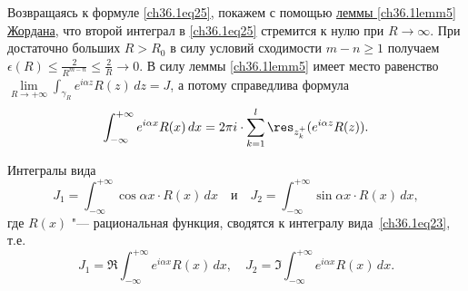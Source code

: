 Возвращаясь к формуле \eqref{ch36.1eq25}, покажем с помощью \hyperref[ch36.1lemm5]{леммы \ref{ch36.1lemm5} Жордана}, что второй интеграл в \eqref{ch36.1eq25} стремится к нулю при $R \to \infty$. При достаточно больших $R > R_0$ в силу условий сходимости $m - n \ge 1$ получаем $\epsilon(R) \le \frac{2}{R^{m - n}} \le \frac{2}{R} \to 0$. В силу леммы  \ref{ch36.1lemm5} имеет место равенство $\lim\limits_{R \to +\infty} \int_{\gamma_R} e^{i \alpha z}R(z) \,dz = J$, а потому справедлива формула
\begin{equation} \label{ch36.1eq27}
\int_{-\infty}^{+\infty} e^{i \alpha x}R(x) \,dx = 2\pi i \cdot \sum_{k = 1}^l \res_{z_k^+} (e^{i \alpha z}R(z)).
\end{equation}

\begin{cons} \label{ch36.1cons2}
Интегралы вида
\begin{equation} \label{ch36.1eq28}
J_1 = \int_{-\infty}^{+\infty} \cos\alpha x \cdot R(x) \,dx \quad \text{и} \quad J_2 = \int_{-\infty}^{+\infty} \sin \alpha x \cdot R(x) \,dx,
\end{equation}
где $R(x)$ "--- рациональная функция, сводятся к интегралу вида~\eqref{ch36.1eq23}, т.е.
$$
J_1 = \Re \int_{-\infty}^{+\infty} e^{i \alpha x} R(x) \,dx, \quad J_2 = \Im \int_{-\infty}^{+\infty} e^{i \alpha x}R(x) \,dx.
$$
\end{cons}